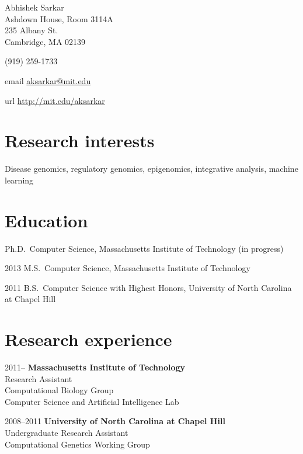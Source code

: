 \documentclass{article}
\begin{document}
{\LARGE Abhishek Sarkar\vspace{1em}}\\
Ashdown House, Room 3114A\\
235 Albany St.\\
Cambridge, MA 02139\vspace{1em}

(919) 259-1733

\begin{hdesc}
\item[email] \url{aksarkar@mit.edu}
\item[url] \url{http://mit.edu/aksarkar}
\end{hdesc}

\section*{Research interests}
Disease genomics, regulatory genomics, epigenomics, integrative analysis,
machine learning

\section*{Education}
\begin{hdesc}
\item[] Ph.D.\ Computer Science, Massachusetts Institute of Technology (in
  progress)
\item[2013] M.S.\ Computer Science, Massachusetts Institute of Technology
\item[2011] B.S.\ Computer Science with Highest Honors, University of North
  Carolina at Chapel Hill
\end{hdesc}

\section*{Research experience}
\begin{hdesc}[itemsep=1em]
\item[2011--] \textbf{Massachusetts Institute of Technology}\\
Research Assistant\\
Computational Biology Group\\
Computer Science and Artificial Intelligence Lab

\item[2008--2011] \textbf{University of North Carolina at Chapel Hill}\\
Undergraduate Research Assistant\\
Computational Genetics Working Group
\end{hdesc}
\end{document}
